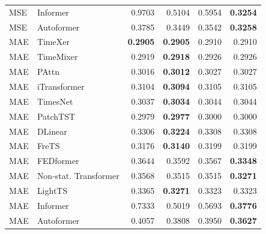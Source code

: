 \begin{longtable}{llrrrr}
MSE & Informer & 0.9703 & 0.5104 & 0.5954 & \textbf{0.3254} \\
MSE & Autoformer & 0.3785 & 0.3449 & 0.3542 & \textbf{0.3258} \\
\midrule
MAE & TimeXer & \textbf{0.2905} & \textbf{0.2905} & 0.2910 & 0.2910 \\
MAE & TimeMixer & 0.2919 & \textbf{0.2918} & 0.2926 & 0.2926 \\
MAE & PAttn & 0.3016 & \textbf{0.3012} & 0.3027 & 0.3027 \\
MAE & iTransformer & 0.3104 & \textbf{0.3094} & 0.3105 & 0.3105 \\
MAE & TimesNet & 0.3037 & \textbf{0.3034} & 0.3044 & 0.3044 \\
MAE & PatchTST & 0.2979 & \textbf{0.2977} & 0.3000 & 0.3000 \\
MAE & DLinear & 0.3306 & \textbf{0.3224} & 0.3308 & 0.3308 \\
MAE & FreTS & 0.3176 & \textbf{0.3140} & 0.3199 & 0.3199 \\
MAE & FEDformer & 0.3644 & 0.3592 & 0.3567 & \textbf{0.3348} \\
MAE & Non-stat. Transformer & 0.3568 & 0.3515 & 0.3515 & \textbf{0.3271} \\
MAE & LightTS & 0.3365 & \textbf{0.3271} & 0.3323 & 0.3323 \\
MAE & Informer & 0.7333 & 0.5019 & 0.5693 & \textbf{0.3776} \\
MAE & Autoformer & 0.4057 & 0.3808 & 0.3950 & \textbf{0.3627} \\
\end{longtable}
\endgroup

